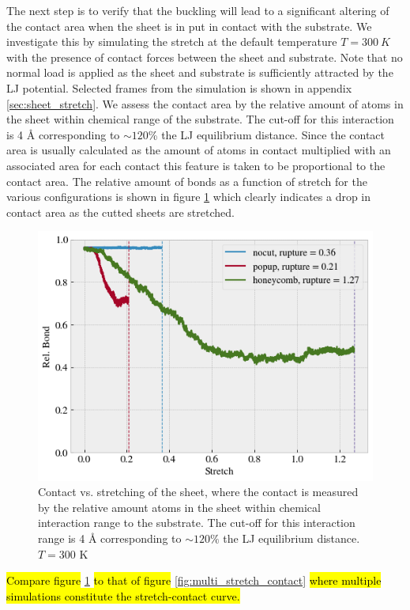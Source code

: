 %
%
%
%

The next step is to verify that the buckling will lead to a significant altering
of the contact area when the sheet is in put in contact with the substrate. We
investigate this by simulating the stretch at the default temperature $T =
\SI{300}{K}$ with the presence of contact forces between the sheet and
substrate. Note that no normal load is applied as the sheet and substrate is
sufficiently attracted by the LJ potential. Selected frames from the simulation is shown in appendix \cref{sec:sheet_stretch}. We assess the contact area by the
relative amount of atoms in the sheet within chemical range of the substrate.
The cut-off for this interaction is 4 Å corresponding to $\sim 120$\% the LJ
equilibrium distance. Since the contact area is usually calculated as the amount
of atoms in contact multiplied with an associated area for each contact this
feature is taken to be proportional to the contact area. The relative amount of
bonds as a function of stretch for the various configurations is shown in figure
\cref{fig:contact_vs_stretch} which clearly indicates a drop in contact area as
the cutted sheets are stretched. 

\begin{figure}[H]
  \centering
  \includegraphics[width=0.6\linewidth]{figures/baseline/contact_vs_stretch.png}
  \caption{Contact vs. stretching of the sheet, where the contact is measured by the relative amount atoms in the sheet within chemical interaction range to the substrate. The cut-off for this interaction range is 4 Å corresponding to $\sim 120 \%$ the LJ equilibrium distance. $T = 300$ K }
  \label{fig:contact_vs_stretch}
\end{figure}

\hl{Compare figure} \cref{fig:contact_vs_stretch} \hl{to that of figure} \cref{fig:multi_stretch_contact} \hl{where multiple simulations constitute the stretch-contact curve.}



